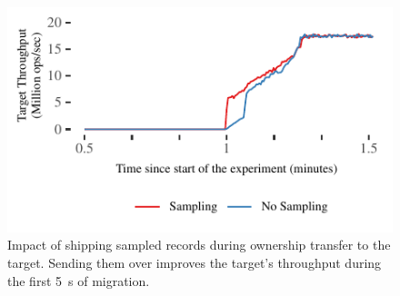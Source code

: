 \begin{figure}[t]
\centering
\includegraphics[width=0.9\columnwidth]{graphs/sampling.pdf}
\caption{Impact of shipping sampled records during ownership transfer to
    the target. Sending them over improves the target's
    throughput during the first 5~s of migration.}
\label{fig:migration-sampling}
\end{figure}
